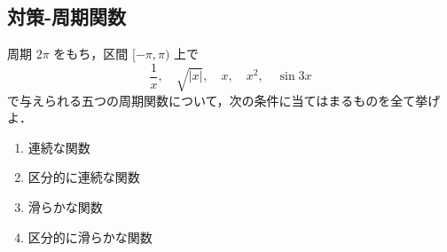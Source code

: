 \subsection{対策-周期関数}
\begin{exercise}[周期関数の分類]
	周期 \(2\pi\) をもち，区間 \([-\pi,\pi)\) 上で
	\[
	\frac{1}{x},\quad \sqrt{|x|},\quad x,\quad x^2,\quad \sin 3x
	\]
	で与えられる五つの周期関数について，次の条件に当てはまるものを全て挙げよ．
	
	\begin{enumerate}
		\item 連続な関数
		\item 区分的に連続な関数
		\item 滑らかな関数
		\item 区分的に滑らかな関数
	\end{enumerate}
\end{exercise}

